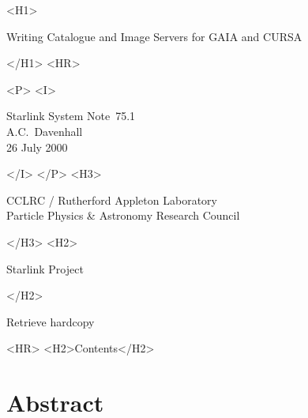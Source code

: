 \documentclass[twoside,11pt]{article}
\newcommand{\stardoccategory}  {Starlink System Note}
\newcommand{\stardocsource}    {ssn\stardocnumber}
\newcommand{\stardocnumber}    {75.1}
\newcommand{\stardocauthors}   {A.C.~Davenhall}
\newcommand{\stardocdate}      {26 July 2000}
\newcommand{\stardoctitle}     {Writing Catalogue and Image Servers for
GAIA and CURSA}
\newcommand{\htmladdnormallink}[2]{#1}
\newcommand{\htmladdimg}[1]{}
\newcommand{\htmlref}[2]{#1}
\newcommand{\htmladdtonavigation}[1]{}
\newcommand{\xlabel}[1]{}
\renewcommand{\_}{\texttt{\symbol{95}}}
\begin{document}
\begin{htmlonly}
   \xlabel{}
   \begin{rawhtml} <H1> \end{rawhtml}
      \stardoctitle
   \begin{rawhtml} </H1> <HR> \end{rawhtml}

   \begin{rawhtml} <P> <I> \end{rawhtml}
   \stardoccategory\ \stardocnumber \\
   \stardocauthors \\
   \stardocdate
   \begin{rawhtml} </I> </P> <H3> \end{rawhtml}
      \htmladdnormallink{CCLRC / Rutherford Appleton Laboratory}
                        {http://www.cclrc.ac.uk} \\
      \htmladdnormallink{Particle Physics \& Astronomy Research Council}
                        {http://www.pparc.ac.uk} \\
   \begin{rawhtml} </H3> <H2> \end{rawhtml}
      \htmladdnormallink{Starlink Project}{http://www.starlink.ac.uk/}
   \begin{rawhtml} </H2> \end{rawhtml}
   \htmladdnormallink{\htmladdimg{source.gif} Retrieve hardcopy}
      {http://www.starlink.ac.uk/cgi-bin/hcserver?\stardocsource}\\

  \label{stardoccontents}
  \begin{rawhtml}
    <HR>
    <H2>Contents</H2>
  \end{rawhtml}
  \htmladdtonavigation{\htmlref{\htmladdimg{contents_motif.gif}}
        {stardoccontents}}

  \section{\xlabel{abstract}Abstract}

\end{htmlonly}
\end{document}
